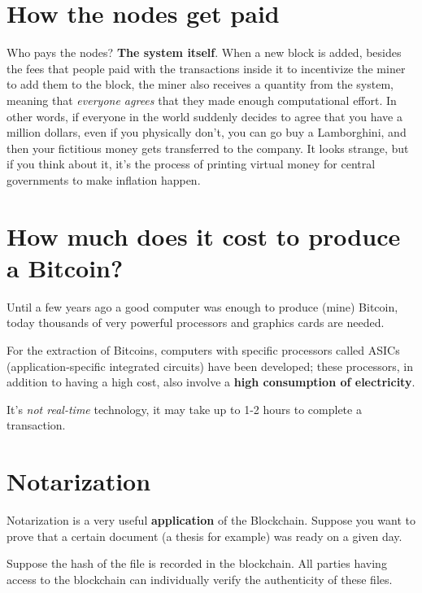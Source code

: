 \section{How the nodes get paid}

Who pays the nodes? \textbf{The system itself}. When a new block is added, besides the fees that people paid with the transactions inside it to incentivize the miner to add them to the block, the miner also receives a quantity from the system, meaning that \textit{everyone agrees} that they made enough computational effort. In other words, if everyone in the world suddenly decides to agree that you have a million dollars, even if you physically don't, you can go buy a Lamborghini, and then your fictitious money gets transferred to the company. It looks strange, but if you think about it, it's the process of printing virtual money for central governments to make inflation happen.


\section{How much does it cost to produce a Bitcoin?}

Until a few years ago a good computer was enough to produce (mine) Bitcoin, today thousands of very powerful processors and graphics cards are needed.

For the extraction of Bitcoins, computers with specific processors called ASICs (application-specific integrated circuits) have been developed; these processors, in addition to having a high cost, also involve a \textbf{high consumption of electricity}.

It's \textit{not real-time} technology, it may take up to 1-2 hours to complete a transaction.

\section{Notarization}

Notarization is a very useful \textbf{application} of the Blockchain. Suppose you want to prove that a certain document (a thesis for example) was ready on a given day.

Suppose the hash of the file is recorded in the blockchain. All parties having access to the blockchain can individually verify the authenticity of these files.

